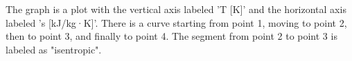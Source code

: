 The graph is a plot with the vertical axis labeled 'T [K]' and the horizontal axis labeled 's [kJ/kg·K]'. There is a curve starting from point 1, moving to point 2, then to point 3, and finally to point 4. The segment from point 2 to point 3 is labeled as "isentropic".